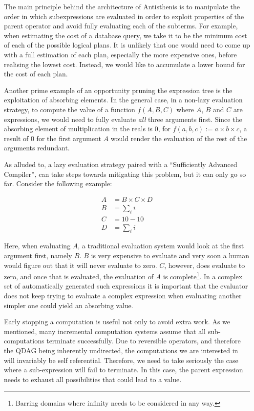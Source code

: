 The main principle behind the architecture of Antisthenis is to
manipulate the order in which subexpressions are evaluated in order
to exploit properties of the parent operator and avoid fully
evaluating each of the subterms. For example, when estimating the cost
of a database query, we take it to be the minimum cost of each of
the possible logical plans. It is unlikely that one would need to come
up with a full estimation of each plan, especially the more expensive
ones, before realising the lowest cost. Instead, we would like to
accumulate a lower bound for the cost of each plan.

Another prime example of an opportunity pruning the expression tree is
the exploitation of absorbing elements. In the general case, in a
non-lazy evaluation strategy, to compute the value of a function
\(f(A,B,C)\) where \(A\), \(B\) and \(C\) are expressions, we would
need to fully evaluate \emph{all} three arguments first. Since the
absorbing element of multiplication in the reals is 0, for
\(f(a,b,c) := a \times b \times c\), a result of 0 for the first
argument \(A\) would render the evaluation of the rest of the
arguments redundant.

As alluded to, a lazy evaluation strategy paired with a ``Sufficiently
Advanced Compiler'', can take steps towards mitigating this problem,
but it can only go so far. Consider the following example:

\begin{align*}
A &= B \times C \times D \\
B &= \sum_i{i} \\
C &= 10 - 10 \\
D &= \sum_i{i}
\end{align*}

Here, when evaluating \(A\), a traditional evaluation system would
look at the first argument first, namely \(B\). \(B\) is very
expensive to evaluate and very soon a human would figure out that it
will never evaluate to zero. \(C\), however, does evaluate to zero,
and once that is evaluated, the evaluation of \(A\) is
complete\footnote{Barring domains where infinity needs to be
  considered in any way.}. In a complex set of automatically generated
such expressions it is important that the evaluator does not keep
trying to evaluate a complex expression when evaluating another
simpler one could yield an absorbing value.

Early stopping a computation is useful not only to avoid extra
work. As we mentioned, many incremental computation systems assume
that all sub-computations terminate successfully. Due to reversible
operators, and therefore the QDAG being inherently undirected, the
computations we are interested in will invariably be self
referential. Therefore, we need to take seriously the case where a
sub-expression will fail to terminate. In this case, the parent
expression needs to exhaust all possibilities that could lead to a
value.

